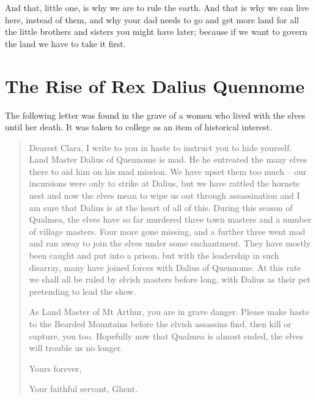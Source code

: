 \begin{multicols}{2}
\begin{exampletext}
And that, little one, is why we are to rule the earth.
And that is why we can live here, instead of them, and why your dad needs to go and get more land for all the little brothers and sisters you might have later; because if we want to govern the land we have to take it first.

\end{exampletext}

\end{multicols}

\section{The Rise of Rex Dalius Quennome}

\begin{multicols}{2}
\label{h_dalius}

\noindent The following letter was found in the grave of a women who lived with the elves until her death.
It was taken to \gls{college} as an item of historical interest.

\begin{quotation}

	Dearest Clara, I write to you in haste to instruct you to hide yourself.
	Land Master Dalius of Quennome is mad.
	He he entreated the many elves there to aid him on his mad mission.
	We have upset them too much -- our incursions were only to strike at Dalius, but we have rattled the hornets nest and now the elves mean to wipe us out through assassination and I am sure that Dalius is at the heart of all of this.
	During this season of Qualmea, the elves have so far murdered three town masters and a number of village masters.
	Four more gone missing, and a further three went mad and ran away to join the elves under some enchantment.
	They have mostly been caught and put into a prison, but with the leadership in such disarray, many have joined forces with Dalius of Quennome.
	At this rate we shall all be ruled by elvish masters before long, with Dalius as their pet pretending to lead the show.

	As Land Master of Mt Arthur, you are in grave danger.
	Please make haste to the Bearded Mountains before the elvish assassins find, then kill or capture, you too.
	Hopefully now that Qualmea is almost ended, the elves will trouble us no longer.

	Yours forever,

	Your faithful servant, Ghent.

\end{quotation}


\end{multicols}
